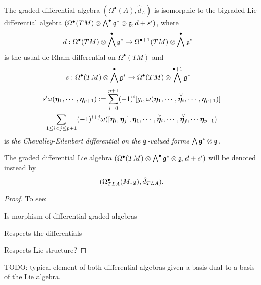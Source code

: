 \begin{theorem}
The graded differential algebra $(\Omega^\bullet(A), \hat d_A)$ is isomorphic to the bigraded Lie differential algebra $(\Omega^\bullet(TM) \otimes \bigwedge^\bullet \mathfrak{g}^* \otimes \mathfrak{g}, d + s')$, where
\begin{align}
    d: \Omega^\bullet(TM) \otimes \bigwedge^\bullet \mathfrak{g}^* &\to \Omega^{\bullet+1}(TM) \otimes \bigwedge^\bullet \mathfrak{g}^*
\end{align}
is the usual de Rham differential on $\Omega^\bullet(TM)$ and
\begin{align*}
    s: \Omega^\bullet(TM) \otimes \bigwedge^\bullet \mathfrak{g}^* &\to \Omega^\bullet(TM) \otimes \bigwedge^{\bullet+1} \mathfrak{g}^*
\end{align*}
\begin{multline}
    s'\omega(\bm{\eta}_1, \cdots, \bm{\eta}_{p+1}) := \sum_{i = 0}^{p+1} (-1)^i [g_i, \omega(\bm{\eta}_1, \cdots, \overset{\vee}{\bm{\eta}_i}, \cdots, \bm{\eta}_{p+1})] \\
    \sum_{1 \leq i < j \leq p+1} (-1)^{i+j} \omega([\bm{\eta}_i, \bm{\eta}_j], \bm{\eta}_1, \cdots, \overset{\vee}{\bm{\eta}_i}, \cdots, \overset{\vee}{\bm{\eta}_j}, \cdots \bm{\eta}_{p+1})
\end{multline}
is \emph{the Chevalley-Eilenbert differential on the $\mathfrak{g}$-valued forms $\bigwedge \mathfrak{g}^* \otimes \mathfrak{g}$}. 

The graded differential Lie algebra $(\Omega^\bullet(TM) \otimes \bigwedge^\bullet \mathfrak{g}^* \otimes \mathfrak{g}, d + s')$ will be denoted instead by
\begin{align}
    (\Omega^\bullet_{TLA}(M, \mathfrak{g}), \hat d_{TLA}).
\end{align}
\end{theorem}

\begin{proof}
To see:

Is morphism of differential graded algebras

Respects the differentials

Respects Lie structure?
\end{proof}

TODO: typical element of both differential algebras given a basis dual to a basis of the Lie algebra.
